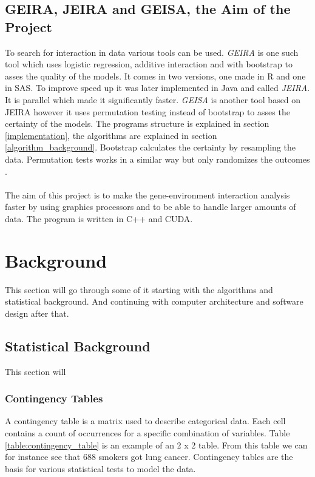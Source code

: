 \documentclass[10pt,a4paper]{report}
\begin{document}
\section{GEIRA, JEIRA and GEISA, the Aim of the Project}
\label{jeira}
To search for interaction in data various tools can be used. \emph{GEIRA}\cite{geira} is one such tool which uses logistic regression, additive interaction and with bootstrap to asses the quality of the models\cite{geira}. It comes in two versions, one made in R and one in SAS. To improve speed up it was later implemented in Java and called \emph{JEIRA}\cite{uvehag_master_thesis}. It is parallel which made it significantly faster\cite{uvehag_master_thesis}. \emph{GEISA}\cite{geisa} is another tool based on JEIRA however it uses permutation testing instead of bootstrap to asses the certainty of the models\cite{geisa}. The programs structure is explained in section \ref{implementation}, the algorithms are explained in section \ref{algorithm_background}. Bootstrap calculates the certainty by resampling the data\cite{agresti_categorical}. Permutation tests works in a similar way but only randomizes the outcomes \cite{lindgren1993statistical}.\\
\\
The aim of this project is to make the gene-environment interaction analysis faster by using graphics processors and to be able to handle larger amounts of data. The program is written in C++ and CUDA.


\clearpage
\chapter{Background}
This section will go through some of it starting with the algorithms and statistical background. And continuing with computer architecture and software design after that.

\section{Statistical Background}
This section will %

\subsection{Contingency Tables}
A contingency table is a matrix used to describe categorical data. Each cell contains a count of occurrences for a specific combination of variables. Table \ref{table:contingency_table} is an example of an 2 x 2 table. From this table we can for instance see that 688 smokers got lung cancer. Contingency tables are the basis for various statistical tests to model the data.\cite{agresti_categorical}
\end{document}
